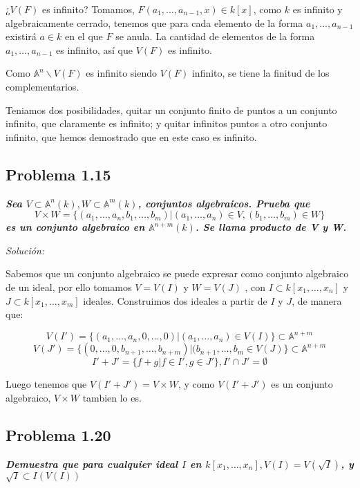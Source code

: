 ¿$V(F)$ es infinito? Tomamos, $F(a_1,\dots,a_{n-1},x)\in k[x]$, como $k$ es infinito y algebraicamente cerrado, tenemos que para cada elemento de la forma $a_1,\dots ,a_{n-1}$ existirá $a\in k$ en el que $F$ se anula. La cantidad de elementos de la forma $a_1,\dots, a_{n-1}$ es infinito, así que $V(F)$ es infinito.

Como $\mathbb{A}^n \backslash V(F)$ es infinito siendo $V(F)$ infinito, se tiene la finitud de los complementarios.

\begin{nota}
Teniamos dos posibilidades, quitar un conjunto finito de puntos a un conjunto infinito, que claramente es infinito; y quitar infinitos puntos a otro conjunto infinito, que hemos demostrado que en este caso es infinito.
\end{nota}


\subsection{Problema 1.15}

\textbf{\textit{Sea $V\subset \mathbb{A}^n(k), W\subset \mathbb{A}^m(k)$, conjuntos algebraicos. Prueba que $$V\times W = \{ (a_1,\dots ,a_n,b_1,\dots ,b_m) | (a_1,\dots ,a_n)\in V, (b_1,\dots ,b_m)\in W \} $$ es un conjunto algebraico en $\mathbb{A}^{n+m}(k)$. Se llama producto de V y W. }}

\textit{Solución: }
\vspace{2mm}

Sabemos que un conjunto algebraico se puede expresar como conjunto algebraico de un ideal, por ello tomamos $V=V(I)$ y $W=V(J)$ , con $I\subset k[x_1,\dots,x_n]$ y $J\subset k[x_1,\dots, x_m]$ ideales. Construimos dos ideales a partir de $I$ y $J$, de manera que:

$$ V(I') = \{(a_1,\dots, a_n,0,\dots,0) |(a_1,\dots,a_n)\in V(I) \} \subset \mathbb{A}^{n+m}$$
$$ V(J') = \{(0,\dots , 0,b_{n+1}, \dots,b_{n+m}) | (b_{n+1},\dots , b_m \in V(J)\} \subset \mathbb{A}^{n+m}  $$
$$I'+J'= \{ f + g | f \in I', g \in J' \}, I'\cap J' =\emptyset$$

Luego tenemos que $V(I'+J')=V\times W$, y como $V(I'+J')$ es un conjunto algebraico, $V\times W$ tambien lo es.

\subsection{Problema 1.20}

\textbf{\textit{Demuestra que para cualquier ideal $I$ en $k[x_1,\dots ,x_n], V(I)=V(\sqrt{I})$, y $\sqrt{I} \subset I(V(I))$  }}

